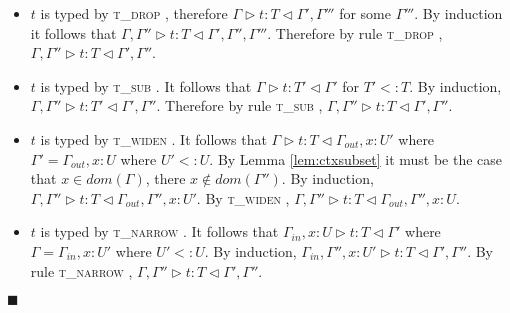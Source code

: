 \documentclass[preprint]{sigplanconf}
\newcommand{\lemref}[1]{Lemma \ref{#1}}
\newcommand{\tdrop}{\textsc{t\_drop} }
\newcommand{\tsub}{\textsc{t\_sub} }
\newcommand{\tnarrow}{\textsc{t\_narrow} }
\newcommand{\twiden}{\textsc{t\_widen} }
\newcommand{\typerule}[4]{#1 \triangleright #2 : #3 \triangleleft #4}
\newcommand{\qed}{$\blacksquare$}
\newenvironment{proof}{\vspace{1ex}\noindent{\bf Proof}\hspace{0.5em}}
  {\hfill\qed\vspace{1ex}}
\begin{document}
\begin{proof}
\begin{itemize}
\item $t$ is typed by \tdrop, therefore $\typerule{\Gamma}{t}{T}{\Gamma', \Gamma'''}$
for some $\Gamma'''$. By induction it follows that
$\typerule{\Gamma, \Gamma''}{t}{T}{\Gamma', \Gamma'', \Gamma'''}$.
Therefore by rule \tdrop,
$\typerule{\Gamma, \Gamma''}{t}{T}{\Gamma', \Gamma''}$.

\item $t$ is typed by \tsub. It follows that $\typerule{\Gamma}{t}{T'}{\Gamma'}$
for $T' <: T$. By induction, $\typerule{\Gamma, \Gamma''}{t}{T'}{\Gamma', \Gamma''}$.
Therefore by rule \tsub, $\typerule{\Gamma, \Gamma''}{t}{T}{\Gamma', \Gamma''}$.

\item $t$ is typed by \twiden. It follows that $\typerule{\Gamma}{t}{T}{\Gamma_{out}, x : U'}$
where $\Gamma' = \Gamma_{out}, x : U$ where $U' <: U$. 
By \lemref{lem:ctxsubset} it must be the case that $x \in dom(\Gamma)$, there
$x \notin dom(\Gamma'')$.
By induction,
$\typerule{\Gamma, \Gamma''}{t}{T}{\Gamma_{out}, \Gamma'', x : U'}$.
By \twiden, 
$\typerule{\Gamma, \Gamma''}{t}{T}{\Gamma_{out}, \Gamma'', x : U}$.

\item $t$ is typed by \tnarrow. It follows that
$\typerule{\Gamma_{in}, x : U}{t}{T}{\Gamma'}$
where $\Gamma = \Gamma_{in}, x : U'$ where $U' <: U$.
By induction,
$\typerule{\Gamma_{in}, \Gamma'', x : U'}{t}{T}{\Gamma', \Gamma''}$.
By rule \tnarrow,
$\typerule{\Gamma, \Gamma''}{t}{T}{\Gamma', \Gamma''}$.
\end{itemize}
\end{proof}

\end{document}
